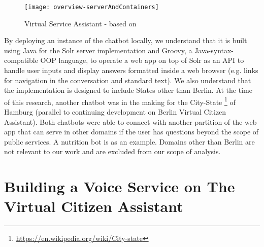 %




\begin{wrapfigure}{l}{0.6\textwidth}
	\caption[Virtual Service Assistant Modules]{Virtual Service Assistant - based on \footnotemark }
	\label{vca:modules}
	\texttt{[image: overview-serverAndContainers]}
\end{wrapfigure}


By deploying an instance of the chatbot locally, we understand that it is built using Java for the Solr server implementation and Groovy, a Java-syntax-compatible OOP language, to operate a web app on top of Solr as an API to handle user inputs and display answers formatted inside a web browser (e.g. links for navigation in the conversation and standard text). We also understand that the implementation is designed to include States other than Berlin. At the time of this research, another chatbot was in the making for the City-State \footnote{\url{https://en.wikipedia.org/wiki/City-state}} of Hamburg (parallel to continuing development on Berlin Virtual Citizen Assistant). Both chatbots were able to connect with another partition of the web app that can serve in other domains if the user has questions beyond the scope of public services. A nutrition bot is as an example. Domains other than Berlin are not relevant to our work and are excluded from our scope of analysis.





\section{Building a Voice Service on The Virtual Citizen Assistant}


